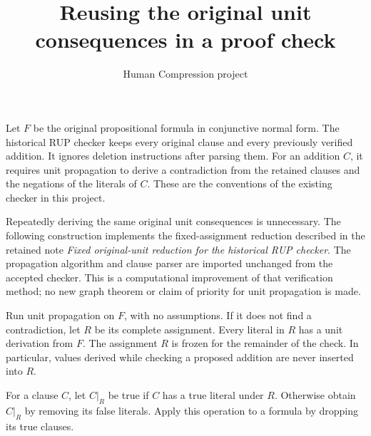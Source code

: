 \documentclass[11pt]{article}
\title{Reusing the original unit consequences in a proof check}
\author{Human Compression project}
\date{}
\begin{document}
\maketitle
Let $F$ be the original propositional formula in conjunctive normal form.
The historical RUP checker keeps every original clause and every previously
verified addition. It ignores deletion instructions after parsing them.
For an addition $C$, it requires unit propagation to derive a contradiction
from the retained clauses and the negations of the literals of $C$.
These are the conventions of the existing checker in this project.

Repeatedly deriving the same original unit consequences is unnecessary.
The following construction implements the fixed-assignment reduction
described in the retained note \emph{Fixed original-unit reduction for the
historical RUP checker}. The propagation algorithm and clause parser are
imported unchanged from the accepted checker. This is a computational
improvement of that verification method; no new graph theorem or claim of
priority for unit propagation is made.

Run unit propagation on $F$, with no assumptions. If it does not find a
contradiction, let $R$ be its complete assignment. Every literal in $R$ has
a unit derivation from $F$. The assignment $R$ is frozen for the remainder
of the check. In particular, values derived while checking a proposed
addition are never inserted into $R$.

For a clause $C$, let $C\vert_R$ be true if $C$ has a true literal under
$R$. Otherwise obtain $C\vert_R$ by removing its false literals. Apply
this operation to a formula by dropping its true clauses.
\end{document}
